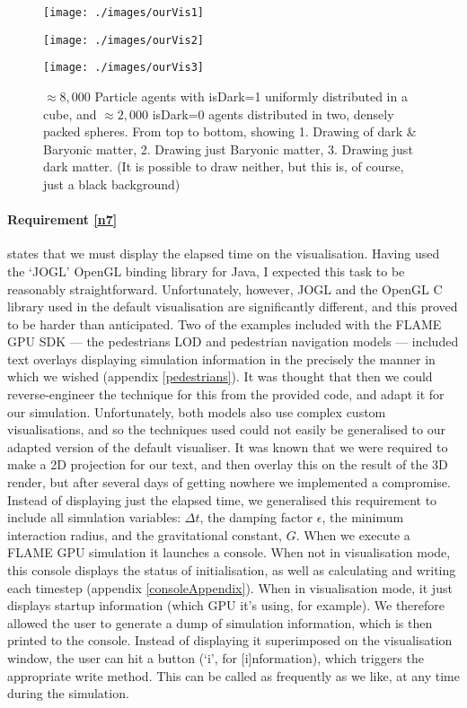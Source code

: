 \documentclass[11pt,a4paper]{article}
\begin{document}
\begin{figure}[H]
\texttt{[image: ./images/ourVis1]}
\end{figure}
\begin{figure}[H]
\texttt{[image: ./images/ourVis2]}
\end{figure}
\begin{figure}[H]
\texttt{[image: ./images/ourVis3]}
\caption[Our visualisation modes]{$\approx 8,000$ Particle agents with isDark=1 uniformly distributed in a cube, and $\approx 2,000$ isDark=0 agents distributed in two, densely packed spheres. From top to bottom, showing 1. Drawing of dark \& Baryonic matter, 2. Drawing just Baryonic matter, 3. Drawing just dark matter. (It is possible to draw neither, but this is, of course, just a black background)}
\end{figure}

\paragraph{Requirement \ref{n7}} states that we must display the elapsed time on the visualisation. Having used the `JOGL' OpenGL binding library for Java, I expected this task to be reasonably straightforward. Unfortunately, however, JOGL and the OpenGL C library used in the default visualisation are significantly different, and this proved to be harder than anticipated. Two of the examples included with the FLAME GPU SDK --- the pedestrians LOD and pedestrian navigation models --- included text overlays displaying simulation information in the precisely the manner in which we wished (appendix \ref{pedestrians}). It was thought that then we could reverse-engineer the technique for this from the provided code, and adapt it for our simulation. Unfortunately, both models also use complex custom visualisations, and so the techniques used could not easily be generalised to our adapted version of the default visualiser. It was known that we were required to make a 2D projection for our text, and then overlay this on the result of the 3D render, but after several days of getting nowhere we implemented a compromise. Instead of displaying just the elapsed time, we generalised this requirement to include all simulation variables: $\Delta t$, the damping factor $\epsilon$, the minimum interaction radius, and the gravitational constant, $G$. When we execute a FLAME GPU simulation it launches a console. When not in visualisation mode, this console displays the status of initialisation, as well as calculating and writing each timestep (appendix \ref{consoleAppendix}). When in visualisation mode, it just displays startup information (which GPU it's using, for example). We therefore allowed the user to generate a dump of simulation information, which is then printed to the console. Instead of displaying it superimposed on the visualisation window, the user can hit a button (`i', for [i]nformation), which triggers the appropriate write method. This can be called as frequently as we like, at any time during the simulation.
\end{document}
